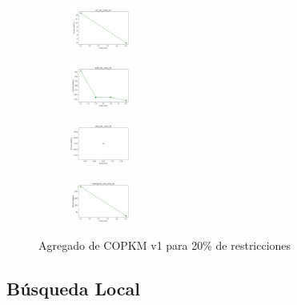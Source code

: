\begin{figure}[H]
\begin{subfigure}
    \end{subfigure}
    \hfill
    \begin{subfigure}
        \centering
        \includegraphics[width=0.234\textwidth]{img/copkm/iris_set_const_20_3773969821_cost.png}
    \end{subfigure}
    \hfill
    \begin{subfigure}
        \centering
        \includegraphics[width=0.234\textwidth]{img/copkm/ecoli_set_const_20_3773969821_cost.png}
    \end{subfigure}
    \hfill
    \begin{subfigure}
        \centering
        \includegraphics[width=0.234\textwidth]{img/copkm/rand_set_const_20_3773969821_cost.png}
    \end{subfigure}
    \hfill
    \begin{subfigure}
        \centering
        \includegraphics[width=0.234\textwidth]{img/copkm/newthyroid_set_const_20_3773969821_cost.png}
    \end{subfigure}
    \caption{Agregado de COPKM v1 para 20\% de restricciones}
\end{figure}

\vspace*{\fill}

\newpage

\subsection{Búsqueda Local}


